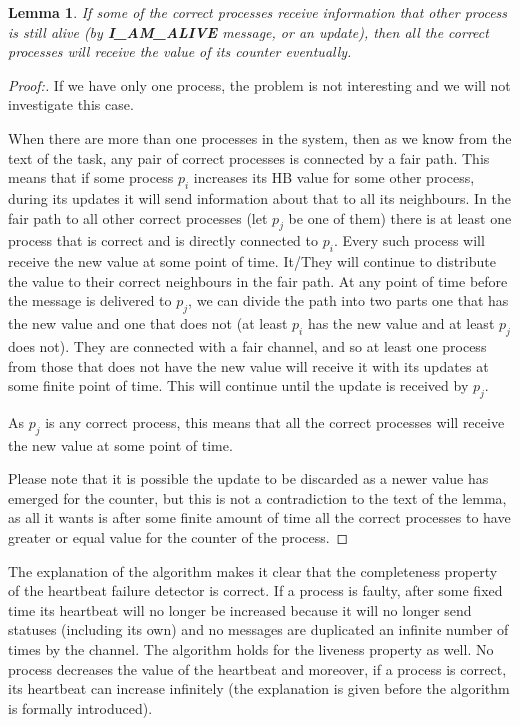 \documentclass[12pt]{article}
\theoremstyle{plain}
\begin{document}
\newtheorem*{lem1}{Lemma}
\begin{lem1}
  If some of the correct processes receive information that other process is still
  alive (by \textbf{I\_AM\_ALIVE} message, or an update), then all the correct
  processes will receive the value of its counter eventually.
\end{lem1}
\begin{proof}[Proof:]
  If we have only one process, the problem is not interesting and we will not
  investigate this case.
  
  When there are more than one processes in the system, then as we know from the
  text of the task, any pair of correct processes is connected by a fair path.
  This means that if some process $p_i$ increases its HB value for some other
  process, during its updates it will send information about that to all its
  neighbours. In the fair path to all other correct processes (let $p_j$ be 
  one of them) there is at least one process that is correct and is directly
  connected to $p_i$. Every such process will receive the new value at some
  point of time. It/They will continue to distribute the value to their correct
  neighbours in the fair path. At any point of time before the message is
  delivered to $p_j$, we can divide the path into two parts one that has the new
  value and one that does not (at least $p_i$ has the new value and at least
  $p_j$ does not). They are connected with a fair channel, and so at least one
  process from those that does not have the new value will receive it with its
  updates at some finite point of time. This will continue until the update is
  received by $p_j$.  

  As $p_j$ is any correct process, this means that all the correct processes
  will receive the new value at some point of time.

  Please note that it is possible the update to be discarded as a newer value
  has emerged for the counter, but this is not a contradiction to the text of 
  the lemma, as all it wants is after some finite amount of time all the correct
  processes to have greater or equal value for the counter of the process.
\end{proof}
  
The explanation of the algorithm makes it clear that the completeness property
of the heartbeat failure detector is correct. If a process is faulty, after some
fixed time its heartbeat will no longer be increased because it will no longer
send statuses (including its own) and no messages are duplicated an infinite 
number of times by the channel. The algorithm holds for the liveness property
as well. No process decreases the value of the heartbeat and moreover, if a
process is correct, its heartbeat can increase infinitely (the explanation is
given before the algorithm is formally introduced).
\end{document}
